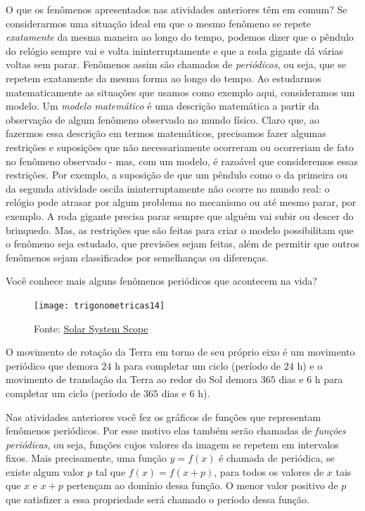 O que os fenômenos apresentados nas atividades anteriores têm em comum? Se considerarmos uma situação ideal em que o mesmo fenômeno se repete \textit{exatamente} da mesma maneira ao longo do tempo, podemos dizer que o pêndulo do relógio sempre vai e volta ininterruptamente e que a roda gigante dá várias voltas sem parar. Fenômenos assim são chamados de \textit{periódicos}, ou seja, que se repetem exatamente da mesma forma ao longo do tempo. Ao estudarmos matematicamente as situações que usamos como exemplo aqui, consideramos um modelo. Um \textit{modelo matemático} é uma descrição matemática a partir da observação de algum fenômeno observado no mundo físico. Claro que, ao fazermos essa descrição em termos matemáticos, precisamos fazer algumas restrições e suposições que não necessariamente ocorreram ou ocorreriam de fato no fenômeno observado - mas, com um modelo, é razoável que consideremos essas restrições. Por exemplo, a suposição de que um pêndulo como o da primeira ou da segunda atividade oscila ininterruptamente não ocorre no mundo real: o relógio pode atrasar por algum problema no mecanismo ou até mesmo parar, por exemplo. A roda gigante precisa parar sempre que alguém vai subir ou descer do brinquedo. Mas, as restrições que são feitas para criar o modelo possibilitam que o fenômeno seja estudado, que previsões sejam feitas, além de permitir que outros fenômenos sejam classificados por semelhanças ou diferenças.

Você conhece mais alguns fenômenos periódicos que acontecem na vida?


\begin{figure}[H]
\centering

\texttt{[image: trigonometricas14]}
\caption{Fonte: \href{https://www.solarsystemscope.com/}{Solar System Scope}}
\label{}
\end{figure}

O movimento de rotação da Terra em torno de seu próprio eixo é um movimento periódico que demora $24$ h para completar um ciclo (período de $24$ h) e o movimento de translação da Terra ao redor do Sol demora $365$ dias e $6$ h para completar um ciclo (período de $365$ dias e $6$ h).

Nas atividades anteriores você fez os gráficos de funções que representam fenômenos periódicos. Por esse motivo elas também serão chamadas de \textit{funções periódicas}, ou seja, funções cujos valores da imagem se repetem em intervalos fixos. Mais precisamente, uma função $y=f(x)$ é chamada de periódica, se existe algum valor $p$ tal que $f(x)=f(x+p)$, para todos os valores de $x$ tais que $x$ e $x+p$ pertençam ao domínio dessa função. O menor valor positivo de $p$ que satisfizer a essa propriedade será chamado o período dessa função.

